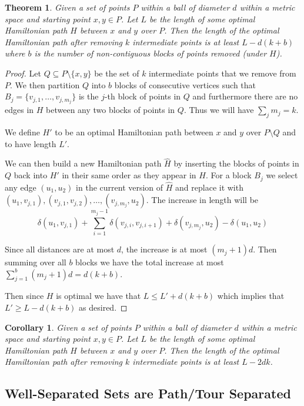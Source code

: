 \documentclass{article}
\newtheorem{thm}{Theorem}[section]
\newtheorem{corollary}{Corollary}[thm]
\theoremstyle{definition}
\newcommand{\dist}{\delta}
\begin{document}
\begin{thm}
    Given a set of points $P$ within a ball of diameter $d$ within a metric space and starting point $x,y \in P$. Let $L$ be the length of some optimal Hamiltonian path $H$ between $x$ and $y$ over $P$. 
    Then the length of the optimal Hamiltonian path after removing $k$ intermediate points is at least $L - d(k+b)$ where $b$ is the number of non-contiguous blocks of points removed (under $H$).
\end{thm}
\begin{proof}
    Let $Q \subseteq P \setminus \{x,y\}$ be the set of $k$ intermediate points that we remove from $P$.
    We then partition $Q$ into $b$ blocks of consecutive vertices such that $B_j = \{v_{j,1}, \dots, v_{j,m_j}\}$ is the $j$-th block of points in $Q$ and furthermore there are no edges in $H$ between any two blocks of points in $Q$. 
    Thus we will have $\sum_j m_j = k$.

    We define $H'$ to be an optimal Hamiltonian path between $x$ and $y$ over $P \setminus Q$ and to have length $L'$.

    We can then build a new Hamiltonian path $\widehat H$ by inserting the blocks of points in $Q$ back into $H'$ in their same order as they appear in $H$.
    For a block $B_j$ we select any edge $(u_1, u_2)$ in the current version of $\widehat H$ and replace it with 
    $(u_1, v_{j,1}), (v_{j,1}, v_{j,2}), \dots, (v_{j,m_j}, u_2)$.
    The increase in length will be
    $$\dist(u_1, v_{j,1}) + \sum_{i=1}^{m_j-1} \dist(v_{j,i}, v_{j,i+1}) + \dist(v_{j,m_j}, u_2) - \dist(u_1, u_2)$$
    
    Since all distances are at most $d$, the increase is at most $(m_j + 1)d$.
    Then summing over all $b$ blocks we have the total increase at most $\sum_{j=1}^b (m_j + 1)d = d(k+b)$.

    Then since $H$ is optimal we have that $L \leq L' + d(k+b)$ which implies that $L' \geq L - d(k+b)$ as desired.
\end{proof}

\begin{corollary}
    Given a set of points $P$ within a ball of diameter $d$ within a metric space and starting point $x,y \in P$. 
    Let $L$ be the length of some optimal Hamiltonian path $H$ between $x$ and $y$ over $P$. 
    Then the length of the optimal Hamiltonian path after removing $k$ intermediate points is at least $L - 2dk$.
\end{corollary}

\subsection{Well-Separated Sets are Path/Tour Separated}
\end{document}

